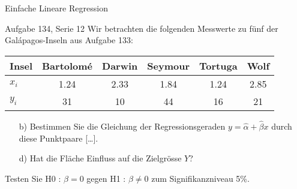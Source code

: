 \documentclass[handout]{beamer}
\begin{document}
\begin{frame}{Einfache Lineare Regression}
\begin{beamerboxesrounded}[shadow]{Aufgabe 134, Serie 12}
Wir betrachten die folgenden Messwerte zu fünf der Galápagos-Inseln aus Aufgabe
133:

\vspace{2mm}\begin{center}{\scriptsize\begin{tabular}{l|ccccc}\toprule
Insel & Bartolomé & Darwin & Seymour & Tortuga & Wolf\\\midrule
$x_i$&
1.24&2.33&1.84&1.24&2.85\\
$y_i$&
31&10&44&16&21\\
\bottomrule
\end{tabular}}\end{center}\vspace{2mm}

\begin{itemize}
\item[b)] Bestimmen Sie die Gleichung der Regressionsgeraden
$y=\hat{\alpha}+\hat{\beta}x$ durch diese Punktpaare [\dots].
\item[d)] Hat die Fläche Einfluss auf die Zielgrösse $Y$?
\end{itemize}
Testen Sie H0 : $\beta = 0$ gegen H1 : $\beta \ne 0$
zum Signifikanzniveau 5\%.
\end{beamerboxesrounded}
\end{frame}

%
%
\end{document}
